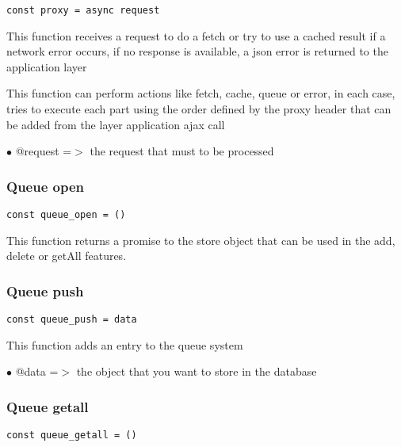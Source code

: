 \documentclass[a4paper]{article}
\begin{document}
\begin{lstlisting}
const proxy = async request
\end{lstlisting}

This function receives a request to do a fetch or try to use a cached result
if a network error occurs, if no response is available, a json error is returned
to the application layer

This function can perform actions like fetch, cache, queue or error, in each
case, tries to execute each part using the order defined by the proxy header
that can be added from the layer application ajax call

\begin{compactitem}
\item[\color{myblue}$\bullet$] @request =$>$ the request that must to be processed
\end{compactitem}

\hypertarget{toc823}{}
\subsubsection{Queue open}

\begin{lstlisting}
const queue_open = ()
\end{lstlisting}

This function returns a promise to the store object that can be used
in the add, delete or getAll features.

\hypertarget{toc824}{}
\subsubsection{Queue push}

\begin{lstlisting}
const queue_push = data
\end{lstlisting}

This function adds an entry to the queue system

\begin{compactitem}
\item[\color{myblue}$\bullet$] @data =$>$ the object that you want to store in the database
\end{compactitem}

\hypertarget{toc825}{}
\subsubsection{Queue getall}

\begin{lstlisting}
const queue_getall = ()
\end{lstlisting}
\end{document}
